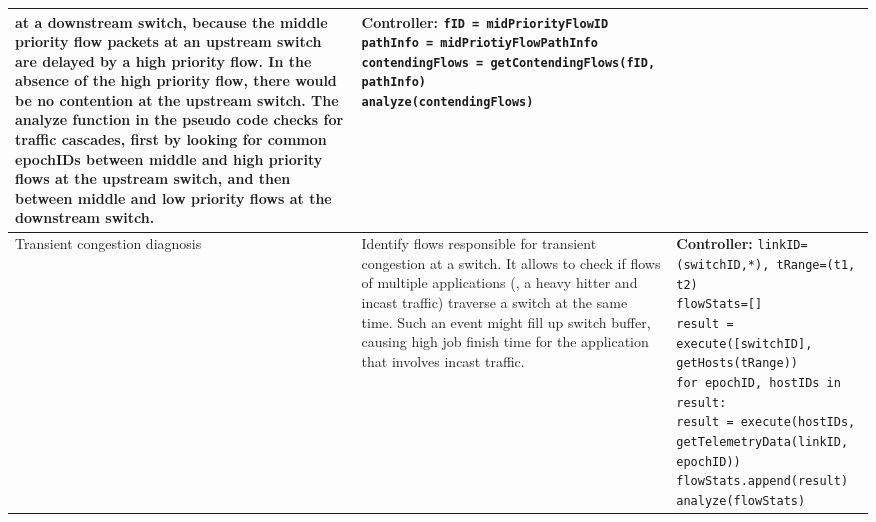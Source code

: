 \begin{table}[!h]
{\begin{tabular}{C{2cm} L{6cm} L{9cm}}
						at a downstream switch, because the middle priority 
						flow packets at an upstream switch are delayed by a high 
						priority flow. In the absence of the high priority flow, there would be no contention at the upstream switch. \newline 
						The analyze function in the pseudo code checks for traffic cascades, first by looking for common epochIDs between middle and high priority flows at the upstream switch, and then between middle and low priority flows at the downstream switch. 
					&	\textbf{Controller:} \newline
						\texttt{fID = midPriorityFlowID \newline
						pathInfo = midPriotiyFlowPathInfo \newline
						contendingFlows = getContendingFlows(fID, \newline
						\hspace{6cm} pathInfo) \newline
						analyze(contendingFlows)} \\
\midrule
Transient congestion diagnosis~\cite{trumpet} & Identify flows responsible for 
										  transient congestion at a switch. It allows to check if flows of multiple applications (\eg, a heavy hitter and incast traffic) traverse a switch at the same time. Such an event might fill up switch buffer, causing high job finish time for the application that involves incast traffic.
					& 	\textbf{Controller:} \newline
						\texttt{linkID=(switchID,*), tRange=(t1, t2) \newline
						flowStats=[] \newline
						result = execute([switchID], getHosts(tRange)) \newline
						for epochID, hostIDs in result: \newline
						\hspace{0.3cm} result = execute(hostIDs, \newline
						\hspace{0.3cm} \hspace{0.6cm} getTelemetryData(linkID, epochID)) \newline
						\hspace{0.3cm} flowStats.append(result) \newline
						analyze(flowStats) 
						} \\

\end{tabular}}
\end{table}
